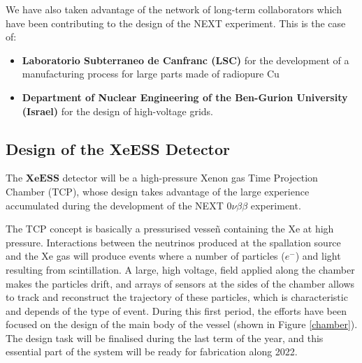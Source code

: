 \documentclass[12pt,a4paper,article]{report} %
\begin{document}
We have also taken advantage of the network of long-term collaborators which have been contributing to the design of the NEXT experiment. This is the case of:
\begin{itemize}
\item \textbf{Laboratorio Subterraneo de Canfranc (LSC)} for the development of a manufacturing process for large parts made of radiopure Cu 
\item \textbf{Department of Nuclear Engineering of the Ben-Gurion University (Israel)} for the design of high-voltage grids. 
\end{itemize}

\subsection*{Design of the XeESS Detector}

The $\mathbf{XeESS}$ detector will be a high-pressure Xenon gas Time Projection Chamber (TCP), whose design takes advantage of the large experience accumulated during the development of the NEXT $0\nu\beta\beta$ experiment. 

The TCP concept is basically a pressurised vesseñ containing the Xe at high pressure. Interactions between the neutrinos produced at the spallation source and the Xe gas will  produce  events where a number of particles ($e^{-}$) and light resulting from scintillation. A large, high voltage, field applied along the chamber makes the particles drift, and arrays of sensors at the sides of the chamber allows to track and reconstruct the trajectory of these particles, which is characteristic and depends of the type of event.  During this first period, the efforts have been focused on the design of the main body of the vessel (shown in Figure \ref{chamber}). The design task will be finalised during the last term of the year, and this essential part of the system will be ready for fabrication along 2022.
\end{document}
